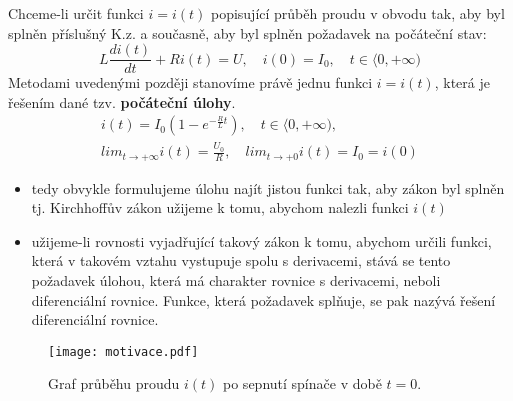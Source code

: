     Chceme-li určit funkci $i=i(t)$ popisující průběh proudu v obvodu tak, aby byl splněn příslušný
    K.z. a současně, aby byl splněn požadavek na počáteční stav:
    \begin{equation}
        L\frac{di(t)}{dt}+Ri(t)=U,\quad i(0)=I_0,\quad t\in\langle 0,+\infty)
    \end{equation}
    Metodami uvedenými později stanovíme právě jednu funkci $i=i(t)$, která je řešením dané tzv.
    \textbf{počáteční úlohy}.
    \begin{equation}
      \begin{array}{c}
         i(t)=I_0\left(1-e^{-\frac{R}{L}t}\right),\quad t\in\langle 0,+\infty), \\
         lim_{t\rightarrow +\infty}i(t)=\frac{U_0}{R},\quad lim_{t\rightarrow +0}i(t)=I_0=i(0)
      \end{array}
    \end{equation}
    \begin{itemize}
      \item tedy obvykle formulujeme úlohu najít jistou funkci tak, aby zákon byl splněn tj.
            Kirchhoffův zákon užijeme k tomu, abychom nalezli funkci $i(t)$
      \item užijeme-li rovnosti vyjadřující takový zákon k tomu, abychom určili funkci, která v
            takovém vztahu vystupuje spolu s derivacemi, stává se tento požadavek úlohou, která má
            charakter rovnice s derivacemi, neboli diferenciální rovnice. Funkce, která požadavek
            splňuje, se pak nazývá řešení diferenciální rovnice.
    \end{itemize}
    
    \begin{figure}
      \centering
      \texttt{[image: motivace.pdf]}
      \caption{Graf průběhu proudu $i(t)$ po sepnutí spínače v době $t=0$.}
      \label{figure:odr_motivace}
    \end{figure}
\printbibliography[heading=subbibliography]
